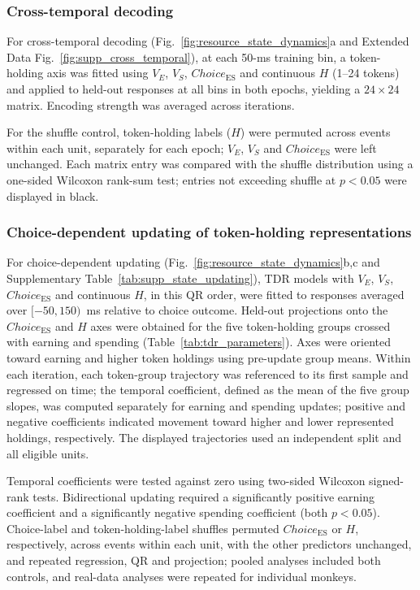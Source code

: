 \documentclass[pdflatex,sn-mathphys-num]{sn-jnl}%
\begin{document}
\subsubsection{Cross-temporal decoding}\label{sec:m_cross}
For cross-temporal decoding (Fig.~\ref{fig:resource_state_dynamics}a and Extended Data Fig.~\ref{fig:supp_cross_temporal}), at each 50-ms training bin, a token-holding axis was fitted using $V_E$, $V_S$, $\mathit{Choice}_{\mathrm{ES}}$ and continuous $H$ (1--24 tokens) and applied to held-out responses at all bins in both epochs, yielding a $24\times24$ matrix. Encoding strength was averaged across iterations.

For the shuffle control, token-holding labels ($H$) were permuted across events within each unit, separately for each epoch; $V_E$, $V_S$ and $\mathit{Choice}_{\mathrm{ES}}$ were left unchanged. Each matrix entry was compared with the shuffle distribution using a one-sided Wilcoxon rank-sum test; entries not exceeding shuffle at $p<0.05$ were displayed in black.

\subsubsection{Choice-dependent updating of token-holding representations}\label{sec:m_updating}
For choice-dependent updating (Fig.~\ref{fig:resource_state_dynamics}b,c and Supplementary Table~\ref{tab:supp_state_updating}), TDR models with $V_E$, $V_S$, $\mathit{Choice}_{\mathrm{ES}}$ and continuous $H$, in this QR order, were fitted to responses averaged over $[-50,150)$~ms relative to choice outcome. Held-out projections onto the $\mathit{Choice}_{\mathrm{ES}}$ and $H$ axes were obtained for the five token-holding groups crossed with earning and spending (Table~\ref{tab:tdr_parameters}). Axes were oriented toward earning and higher token holdings using pre-update group means. Within each iteration, each token-group trajectory was referenced to its first sample and regressed on time; the temporal coefficient, defined as the mean of the five group slopes, was computed separately for earning and spending updates; positive and negative coefficients indicated movement toward higher and lower represented holdings, respectively. The displayed trajectories used an independent split and all eligible units.

Temporal coefficients were tested against zero using two-sided Wilcoxon signed-rank tests. Bidirectional updating required a significantly positive earning coefficient and a significantly negative spending coefficient (both $p<0.05$). Choice-label and token-holding-label shuffles permuted $\mathit{Choice}_{\mathrm{ES}}$ or $H$, respectively, across events within each unit, with the other predictors unchanged, and repeated regression, QR and projection; pooled analyses included both controls, and real-data analyses were repeated for individual monkeys.
\end{document}
